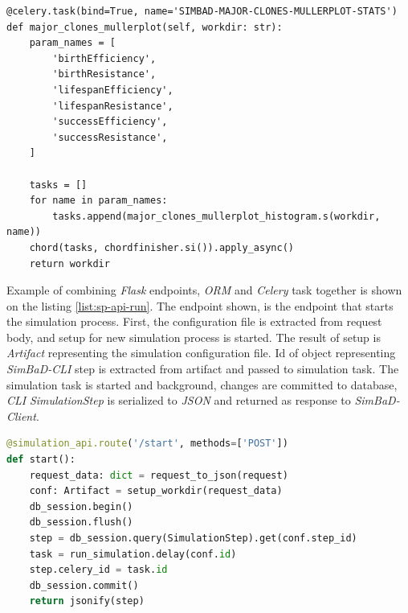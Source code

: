 \begin{lstlisting}[label=list:sp-celery-chord,caption=Start simulation endpoint, basicstyle=\footnotesize\ttfamily]
@celery.task(bind=True, name='SIMBAD-MAJOR-CLONES-MULLERPLOT-STATS')
def major_clones_mullerplot(self, workdir: str):
    param_names = [
        'birthEfficiency',
        'birthResistance',
        'lifespanEfficiency',
        'lifespanResistance',
        'successEfficiency',
        'successResistance',
    ]

    tasks = []
    for name in param_names:
        tasks.append(major_clones_mullerplot_histogram.s(workdir, name))
    chord(tasks, chordfinisher.si()).apply_async()
    return workdir
\end{lstlisting}
Example of combining \textit{Flask} endpoints, \textit{ORM} and \textit{Celery} task together is shown on the listing \ref{list:sp-api-run}. The endpoint shown, is the endpoint that starts the simulation process.
First, the configuration file is extracted from request body, and setup for new simulation process is started. The result of setup is \textit{Artifact} representing the simulation configuration file. Id of object representing \textit{SimBaD-CLI} step is extracted from artifact and passed to simulation task. The simulation task is started and background, changes are committed to database, \textit{CLI} \textit{SimulationStep} is serialized to \textit{JSON} and returned as response to \textit{SimBaD-Client}.
\begin{lstlisting}[label=list:sp-api-run,caption=Start simulation endpoint, basicstyle=\footnotesize\ttfamily, language=python]
@simulation_api.route('/start', methods=['POST'])
def start():
    request_data: dict = request_to_json(request)
    conf: Artifact = setup_workdir(request_data)
    db_session.begin()
    db_session.flush()
    step = db_session.query(SimulationStep).get(conf.step_id)
    task = run_simulation.delay(conf.id)
    step.celery_id = task.id
    db_session.commit()
    return jsonify(step)
\end{lstlisting}

